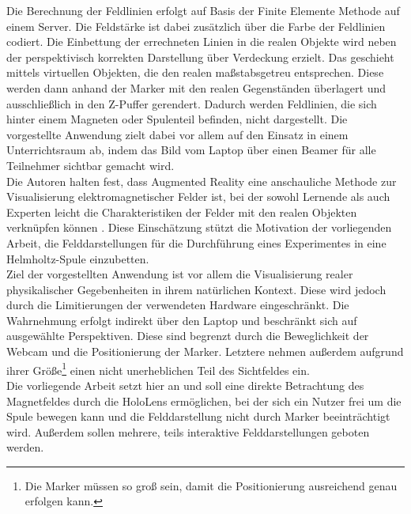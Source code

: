 Die Berechnung der Feldlinien erfolgt auf Basis der Finite Elemente Methode auf einem Server. Die Feldstärke ist dabei zusätzlich über die Farbe der Feldlinien codiert. Die Einbettung der errechneten Linien in die realen Objekte wird neben der perspektivisch korrekten Darstellung über Verdeckung erzielt. Das geschieht mittels  virtuellen Objekten, die den realen maßstabsgetreu entsprechen. Diese werden dann anhand der Marker mit den realen Gegenständen überlagert und ausschließlich in den Z-Puffer gerendert. Dadurch werden Feldlinien, die sich hinter einem Magneten oder Spulenteil befinden, nicht dargestellt. Die vorgestellte Anwendung zielt dabei vor allem auf den Einsatz in einem Unterrichtsraum ab, indem das Bild vom Laptop über einen Beamer für alle Teilnehmer sichtbar gemacht wird.\\

Die Autoren halten fest, dass Augmented Reality eine anschauliche Methode zur Visualisierung elektromagnetischer Felder ist, bei der sowohl Lernende als auch Experten leicht die Charakteristiken der Felder mit den realen Objekten verknüpfen können \cite{Buchau09}. Diese Einschätzung stützt die Motivation der vorliegenden Arbeit, die Felddarstellungen für die Durchführung eines Experimentes in eine Helmholtz-Spule einzubetten.\\

Ziel der vorgestellten Anwendung ist vor allem die Visualisierung realer physikalischer Gegebenheiten in ihrem natürlichen Kontext. Diese wird jedoch durch die Limitierungen der verwendeten Hardware eingeschränkt. Die Wahrnehmung erfolgt indirekt über den Laptop und beschränkt sich auf ausgewählte Perspektiven. Diese sind begrenzt durch die Beweglichkeit der Webcam und die Positionierung der Marker. Letztere nehmen außerdem aufgrund ihrer Größe\footnote{Die Marker müssen so groß sein, damit die Positionierung ausreichend genau erfolgen kann.} einen nicht unerheblichen Teil des Sichtfeldes ein.\\

Die vorliegende Arbeit setzt hier an und soll eine direkte Betrachtung des Magnetfeldes durch die HoloLens ermöglichen, bei der sich ein Nutzer frei um die Spule bewegen kann und die Felddarstellung nicht durch Marker beeinträchtigt wird. Außerdem sollen mehrere, teils interaktive Felddarstellungen geboten werden.\\

